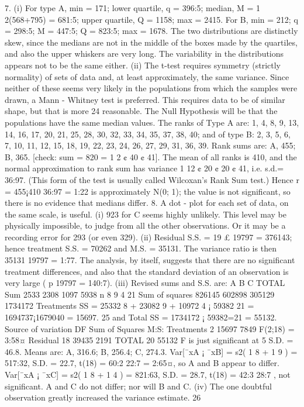 7. (i) For type A, min = 171; lower quartile, q = 396:5; median, M = 1
2(568+795) =
681:5; upper quartile, Q = 1158; max = 2415.
For B, min = 212; q = 298:5; M = 447:5; Q = 823:5; max = 1678.
The two distributions are distinctly skew, since the medians are not in the
middle of the boxes made by the quartiles, and also the upper whiskers are
very long. The variability in the distributions appears not to be the same
either.
(ii) The t-test requires symmetry (strictly normality) of sets of data and, at least
approximately, the same variance. Since neither of these seems very likely
in the populations from which the samples were drawn, a Mann - Whitney
test is preferred. This requires data to be of similar shape, but that is more
24
reasonable. The Null Hypothesis will be that the populations have the same
median values. The ranks of Type A are: 1, 4, 8, 9, 13, 14, 16, 17, 20, 21,
25, 28, 30, 32, 33, 34, 35, 37, 38, 40; and of type B: 2, 3, 5, 6, 7, 10, 11, 12,
15, 18, 19, 22, 23, 24, 26, 27, 29, 31, 36, 39.
Rank sums are: A, 455; B, 365. [check: sum = 820 = 1
2 ¢ 40 ¢ 41]. The mean
of all ranks is 410, and the normal approximation to rank sum has variance
1
12 ¢ 20 ¢ 20 ¢ 41, i.e. s.d.= 36:97.
(This form of the test is usually called Wilcoxan’s Rank Sum test.)
Hence r = 455¡410
36:97 = 1:22 is approximately N(0; 1); the value is not significant,
so there is no evidence that medians differ.
8. A dot - plot for each set of data, on the same scale, is useful.
(i) 923 for C seems highly unlikely. This level may be physically impossible, to
judge from all the other observations. Or it may be a recording error for 293
(or even 329).
(ii) Residual S.S. = 19 £ 19797 = 376143; hence treatment S.S. = 70262 and
M.S. = 35131. The variance ratio is then 35131
19797 = 1:77.
The analysis, by itself, suggests that there are no significant treatment differences,
and also that the standard deviation of an observation is very large
(
p
19797 = 140:7).
(iii) Revised sums and S.S. are:
A B C TOTAL
Sum 2533 2308 1097 5938
n 8 9 4 21
Sum of squares 826145 602898 305129 1734172
Treatments SS = 25332
8 + 23082
9 + 10972
4 ¡ 59382
21 = 1694737¡1679040 = 15697.
25
and Total SS = 1734172 ¡ 59382=21 = 55132.
Source of variation DF Sum of Squares M:S:
Treatments 2 15697 7849 F(2;18) = 3:58¤
Residual 18 39435 2191
TOTAL 20 55132
F is just significant at 5%
S.D. = 46.8. Means are: A, 316.6; B, 256.4; C, 274.3. Var[¯xA ¡ ¯xB] =
s2( 1
8 + 1
9 ) = 517:32, S.D. = 22.7, t(18) = 60:2
22:7 = 2:65¤, so A and B appear
to differ. Var[¯xA ¡ ¯xC] = s2( 1
8 + 1
4 ) = 821:63, S.D. = 28.7, t(18) = 42:3
28:7 , not
significant. A and C do not differ; nor will B and C.
(iv) The one doubtful observation greatly increased the variance estimate.
26
